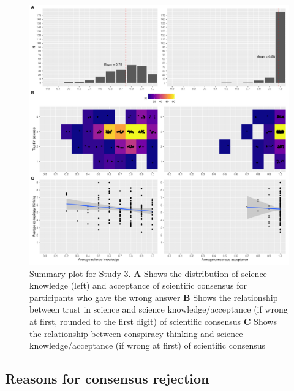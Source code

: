 \documentclass[
  doc,floatsintext]{apa6}
\begin{document}
\begin{figure}
\centering
\includegraphics{output/figures/exp3-plot-overview.pdf}
\caption{\label{fig:exp3-plot-overview}Summary plot for Study 3. \textbf{A} Shows the distribution of science knowledge (left) and acceptance of scientific consensus for participants who gave the wrong answer \textbf{B} Shows the relationship between trust in science and science knowledge/acceptance (if wrong at first, rounded to the first digit) of scientific consensus \textbf{C} Shows the relationship between conspiracy thinking and science knowledge/acceptance (if wrong at first) of scientific consensus}
\end{figure}

\subsection{Reasons for consensus rejection}\label{reasons-for-consensus-rejection-1}
\end{document}
